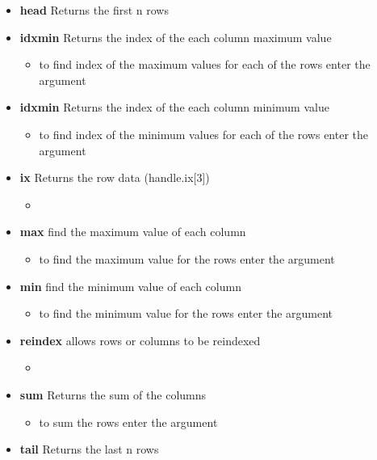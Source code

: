 \begin{itemize}
\begin{itemize}
    \end{itemize}
  \item \textbf{head} Returns the first n rows
  \item \textbf{idxmin} Returns the index of the each column maximum value
    \begin{itemize}
      \item to find index of the maximum values for each of the rows enter
        the argument \color{red}{axis=1}
    \end{itemize}
  \item \textbf{idxmin} Returns the index of the each column minimum value
    \begin{itemize}
      \item to find index of the minimum values for each of the rows enter
        the argument \color{red}{axis=1}
    \end{itemize}
  \item \textbf{ix} Returns the row data (handle.ix[3])
    \begin{itemize}
      \item \color{red}{if additional rows and columns are added using this
        command it will have the same effect as calling reindex.}
    \end{itemize}
  \item \textbf{max} find the maximum value of each column
    \begin{itemize}
      \item to find the maximum value for the rows enter the argument
        \color{red}{axis=1}
    \end{itemize}
  \item \textbf{min} find the minimum value of each column
    \begin{itemize}
      \item to find the minimum value for the rows enter the argument
        \color{red}{axis=1}
    \end{itemize}
  \item \textbf{reindex} allows rows or columns to be reindexed
    \begin{itemize}
      \item \color{red}{if no arguments are passed the rows will be reindexed,
        and if the columns argument is passed the columns will be reindexed.}
    \end{itemize}
  \item \textbf{sum} Returns the sum of the columns
    \begin{itemize}
      \item to sum the rows enter the argument \color{red}{axis=1}
    \end{itemize}
  \item \textbf{tail} Returns the last n rows
\end{itemize}

